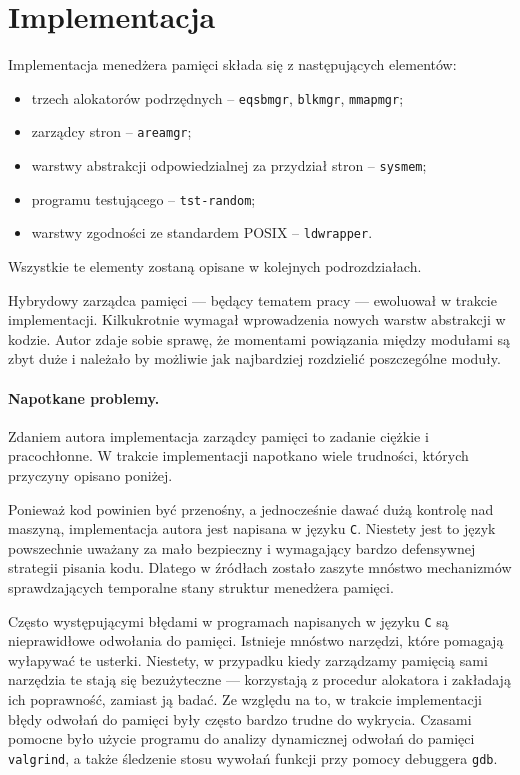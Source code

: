 \documentclass[12pt,a4paper,titlepage,twoside]{mwart}
\begin{document}
\newpage


\section{Implementacja}
\hypertarget{Implementacja}{}

Implementacja menedżera pamięci składa się z następujących elementów:
\begin{itemize}
\item trzech alokatorów podrzędnych -- \verb+eqsbmgr+, \verb+blkmgr+, \verb+mmapmgr+;
\item zarządcy stron -- \verb+areamgr+;
\item warstwy abstrakcji odpowiedzialnej za przydział stron -- \verb+sysmem+;
\item programu testującego -- \verb+tst-random+;
\item warstwy zgodności ze standardem POSIX -- \verb+ldwrapper+.
\end{itemize}
Wszystkie te elementy zostaną opisane w kolejnych podrozdziałach.

\vspace{1ex}

Hybrydowy zarządca pamięci --- będący tematem pracy --- ewoluował w trakcie
implementacji.  Kilkukrotnie wymagał wprowadzenia nowych warstw abstrakcji w
kodzie. Autor zdaje sobie sprawę, że momentami powiązania między modułami są
zbyt duże i należało by możliwie jak najbardziej rozdzielić poszczególne
moduły.

\paragraph{Napotkane problemy.} Zdaniem autora implementacja zarządcy pamięci
to zadanie ciężkie i pracochłonne. W trakcie implementacji napotkano wiele
trudności, których przyczyny opisano poniżej.

Ponieważ kod powinien być przenośny, a jednocześnie dawać dużą kontrolę nad
maszyną, implementacja autora jest napisana w języku \verb+C+.  Niestety jest
to język powszechnie uważany za mało bezpieczny i wymagający bardzo defensywnej
strategii pisania kodu. Dlatego w źródłach zostało zaszyte mnóstwo mechanizmów
sprawdzających temporalne stany struktur menedżera pamięci.
	
Często występującymi błędami w programach napisanych w języku \verb+C+ są
nieprawidłowe odwołania do pamięci. Istnieje mnóstwo narzędzi, które pomagają
wyłapywać te usterki. Niestety, w przypadku kiedy zarządzamy pamięcią sami
narzędzia te stają się bezużyteczne --- korzystają z procedur alokatora i
zakładają ich poprawność, zamiast ją badać. Ze względu na to, w trakcie
implementacji błędy odwołań do pamięci były często bardzo trudne do wykrycia.
Czasami pomocne było użycie programu do analizy dynamicznej odwołań do pamięci
\verb+valgrind+, a także śledzenie stosu wywołań funkcji przy pomocy debuggera
\verb+gdb+.
\end{document}
